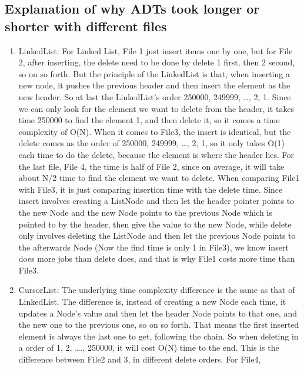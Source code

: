 \documentclass[]{article}
\begin{document}
\subsection{Explanation of why ADTs took longer or shorter with
different
files}\label{explanation-of-why-adts-took-longer-or-shorter-with-different-files}

\begin{enumerate}
\def\labelenumi{\arabic{enumi}.}
\item
  LinkedList: For Linked List, File 1 just insert items one by one, but
  for File 2, after inserting, the delete need to be done by delete 1
  first, then 2 second, so on so forth. But the principle of the
  LinkedList is that, when inserting a new node, it pushes the previous
  header and then insert the element as the new header. So at last the
  LinkedList's order 250000, 249999, \ldots{}, 2, 1. Since we can only
  look for the element we want to delete from the header, it takes time
  250000 to find the element 1, and then delete it, so it comes a time
  complexity of O(N). When it comes to File3, the insert is identical,
  but the delete comes as the order of 250000, 249999, \ldots{}, 2, 1,
  so it only takes O(1) each time to do the delete, because the element
  is where the header lies. For the last file, File 4, the time is half
  of File 2, since on average, it will take about N/2 time to find the
  element we want to delete. When comparing File1 with File3, it is just
  comparing insertion time with the delete time. Since insert involves
  creating a ListNode and then let the header pointer points to the new
  Node and the new Node points to the previous Node which is pointed to
  by the header, then give the value to the new Node, while delete only
  involves deleting the ListNode and then let the previous Node points
  to the afterwards Node (Now the find time is only 1 in File3), we know
  insert does more jobs than delete does, and that is why File1 costs
  more time than File3.
\item
  CursorList: The underlying time complexity difference is the same as
  that of LinkedList. The difference is, instead of creating a new Node
  each time, it updates a Node's value and then let the header Node
  points to that one, and the new one to the previous one, so on so
  forth. That means the first inserted element is always the last one to
  get, following the chain. So when deleting in a order of 1, 2,
  \ldots{}., 250000, it will cost O(N) time to the end. This is the
  difference between File2 and 3, in different delete orders. For File4,

\end{enumerate}
\end{document}
